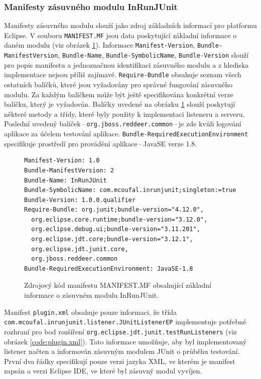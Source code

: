       \subsubsection{Manifesty zásuvného modulu InRunJUnit}
	Manifesty zásuvného modulu slouží jako zdroj základních informací pro platformu Eclipse. V souboru \texttt{MANIFEST.MF} jsou data poskytující základní informace o daném modulu (viz obrázek \ref{code:manifest.mf}). Informace \texttt{Manifest-Version}, \texttt{Bundle-ManifestVersion}, \texttt{Bundle-Name}, \texttt{Bundle-SymbolicName}, \texttt{Bundle-Version} slouží pro popis manifestu a jednoznačnou identifikaci zásuvného modulu a z hlediska implementace nejsou příliš zajímavé. \texttt{Require-Bundle} obsahuje seznam všech ostatních balíčků, které jsou vyžadovány pro správné fungování zásuvného modulu. Za každým balíčkem může být ještě specifikována konkrétní verze balíčku, který je vyžadován. Balíčky uvedené na obrázku \ref{code:manifest.mf} slouží poskytují některé metody a třídy, které byly použity k implementaci listeneru a serveru. Poslední uvedený balíček\,--\,\texttt{org.jboss.reddeer.common}\,--\,je zde kvůli logování aplikace za účelem testování aplikace. \texttt{Bundle-RequiredExecutionEnvironment} specifikuje prostředí pro provádění aplikace\,--\,JavaSE verze 1.8. 
	
	\lstset{language=}
	\begin{figure}
	  \begin{lstlisting}[frame=single]
Manifest-Version: 1.0
Bundle-ManifestVersion: 2
Bundle-Name: InRunJUnit
Bundle-SymbolicName: com.mcoufal.inrunjunit;singleton:=true
Bundle-Version: 1.0.0.qualifier
Require-Bundle: org.junit;bundle-version="4.12.0",
  org.eclipse.core.runtime;bundle-version="3.12.0",
  org.eclipse.debug.ui;bundle-version="3.11.201",
  org.eclipse.jdt.core;bundle-version="3.12.1",
  org.eclipse.jdt.junit.core,
  org.jboss.reddeer.common
Bundle-RequiredExecutionEnvironment: JavaSE-1.8
	  \end{lstlisting}
	  \caption{Zdrojový kód manifestu MANIFEST.MF obsahující základní informace o zásuvném modulu InRunJUnit.}
	  \label{code:manifest.mf}
	\end{figure}
	
	Manifest \texttt{plugin.xml} obsahuje pouze informaci, že třída \texttt{com.\-mcoufal.\-inrunjunit.\-listener.\-JUnitListenerEP} implementuje potřebné rozhraní pro bod rozšíření \texttt{org.\-eclipse.\-jdt.\-junit.\-testRunListeners} (viz obrázek \ref{code:plugin.xml}). Tato informace umožňuje, aby byl implementovaný listener načten a informován zásuvným modulem JUnit o průběhu testování. První dva řádky specifikují pouze verzi jazyka XML, ve kterém je manifest zapsán a verzi Eclipse IDE, ve které byl zásuvný modul vyvíjen.  

